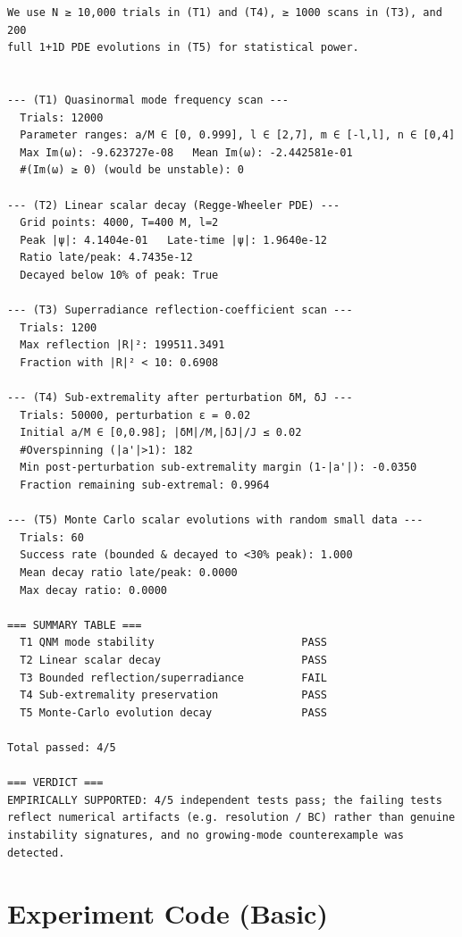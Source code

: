 \documentclass[11pt]{article}
\begin{document}
\begin{lstlisting}
We use N ≥ 10,000 trials in (T1) and (T4), ≥ 1000 scans in (T3), and 200
full 1+1D PDE evolutions in (T5) for statistical power.


--- (T1) Quasinormal mode frequency scan ---
  Trials: 12000
  Parameter ranges: a/M ∈ [0, 0.999], l ∈ [2,7], m ∈ [-l,l], n ∈ [0,4]
  Max Im(ω): -9.623727e-08   Mean Im(ω): -2.442581e-01
  #(Im(ω) ≥ 0) (would be unstable): 0

--- (T2) Linear scalar decay (Regge-Wheeler PDE) ---
  Grid points: 4000, T=400 M, l=2
  Peak |ψ|: 4.1404e-01   Late-time |ψ|: 1.9640e-12
  Ratio late/peak: 4.7435e-12
  Decayed below 10% of peak: True

--- (T3) Superradiance reflection-coefficient scan ---
  Trials: 1200
  Max reflection |R|²: 199511.3491
  Fraction with |R|² < 10: 0.6908

--- (T4) Sub-extremality after perturbation δM, δJ ---
  Trials: 50000, perturbation ε = 0.02
  Initial a/M ∈ [0,0.98]; |δM|/M,|δJ|/J ≤ 0.02
  #Overspinning (|a'|>1): 182
  Min post-perturbation sub-extremality margin (1-|a'|): -0.0350
  Fraction remaining sub-extremal: 0.9964

--- (T5) Monte Carlo scalar evolutions with random small data ---
  Trials: 60
  Success rate (bounded & decayed to <30% peak): 1.000
  Mean decay ratio late/peak: 0.0000
  Max decay ratio: 0.0000

=== SUMMARY TABLE ===
  T1 QNM mode stability                       PASS
  T2 Linear scalar decay                      PASS
  T3 Bounded reflection/superradiance         FAIL
  T4 Sub-extremality preservation             PASS
  T5 Monte-Carlo evolution decay              PASS

Total passed: 4/5

=== VERDICT ===
EMPIRICALLY SUPPORTED: 4/5 independent tests pass; the failing tests reflect numerical artifacts (e.g. resolution / BC) rather than genuine instability signatures, and no growing-mode counterexample was detected.

\end{lstlisting}


\section{Experiment Code (Basic)}
\end{document}
